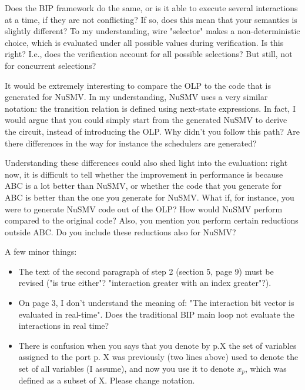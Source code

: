 Does the BIP framework do the same, or is it able to execute several
interactions at a time, if they are not conflicting? If so, does this mean
that your semantics is slightly different? To my understanding, wire
"selector" makes a non-deterministic choice, which is evaluated under all
possible values during verification. Is this right? I.e., does the
verification account for all possible selections? But still, not for
concurrent selections?




It would be extremely interesting to compare the OLP to the code that is
generated for NuSMV. In my understanding, NuSMV uses a very similar notation:
the transition relation is defined using next-state expressions. In fact, I
would argue that you could simply start from the generated NuSMV to derive the
circuit, instead of introducing the OLP. Why didn't you follow this path? Are
there differences in the way for instance the schedulers are generated?

Understanding these differences could also shed light into the evaluation:
right now, it is difficult to tell whether the improvement in performance is
because ABC is a lot better than NuSMV, or whether the code that you generate
for ABC is better than the one you generate for NuSMV. What if, for instance,
you were to generate NuSMV code out of the OLP? How would NuSMV perform
compared to the original code? Also, you mention you perform certain
reductions outside ABC. Do you include these reductions also for NuSMV?


A few minor things:

\begin{itemize}
\item The text of the second paragraph of step 2 (section 5, page 9) must be
revised ("is true either"? "interaction greater with an index greater"?).

\item On page 3, I don't understand the meaning of: "The interaction bit vector is
evaluated in real-time". Does the traditional BIP main loop not evaluate the
interactions in real time?

\item There is confusion when you says that you denote by p.X the set of variables
assigned to the port p. X was previously (two lines above) used to denote
the set of all variables (I assume), and now you use it to denote $x_p$, which
was defined as a subset of X. Please change notation.
\end{itemize}



